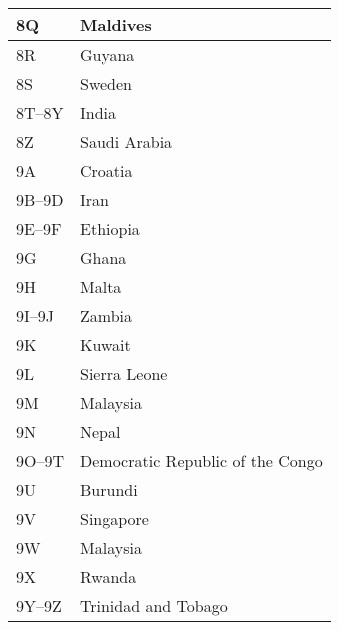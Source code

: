 \begin{longtable}{|l|l|}
  \hline
  8Q                  & Maldives                                  \\
  \hline
  8R                  & Guyana                                    \\
  \hline
  8S                  & Sweden                                    \\
  \hline
  8T--8Y              & India                                     \\
  \hline
  8Z                  & Saudi Arabia                              \\
  \hline
  9A                  & Croatia                                   \\
  \hline
  9B--9D              & Iran                                      \\
  \hline
  9E--9F              & Ethiopia                                  \\
  \hline
  9G                  & Ghana                                     \\
  \hline
  9H                  & Malta                                     \\
  \hline
  9I--9J              & Zambia                                    \\
  \hline
  9K                  & Kuwait                                    \\
  \hline
  9L                  & Sierra Leone                              \\
  \hline
  9M                  & Malaysia                                  \\
  \hline
  9N                  & Nepal                                     \\
  \hline
  9O--9T              & Democratic Republic of the Congo          \\
  \hline
  9U                  & Burundi                                   \\
  \hline
  9V                  & Singapore                                 \\
  \hline
  9W                  & Malaysia                                  \\
  \hline
  9X                  & Rwanda                                    \\
  \hline
  9Y--9Z              & Trinidad and Tobago                       \\
  \hline
\end{longtable}

\newpage

